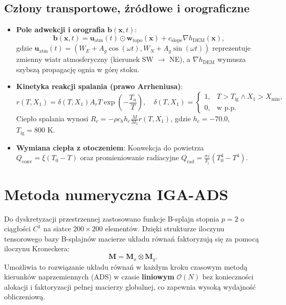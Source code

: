 \documentclass[11pt,a4paper]{article}
\begin{document}
\subsection{Człony transportowe, źródłowe i orograficzne}
\begin{itemize}
    \item \textbf{Pole adwekcji i orografia $\mathbf{b}(\mathbf{x}, t)$}:
    \begin{equation}
        \mathbf{b}(\mathbf{x}, t) = \mathbf{u}_{\text{atm}}(t) \odot \mathbf{w}_{\text{topo}}(\mathbf{x}) + c_{\text{slope}} \nabla h_{\text{DEM}}(\mathbf{x}),
    \end{equation}
    gdzie $\mathbf{u}_{\text{atm}}(t) = (W_E + A_g \cos(\omega t), W_N + A_g \sin(\omega t))$ reprezentuje zmienny wiatr atmosferyczny (kierunek SW $\to$ NE), a $\nabla h_{\text{DEM}}$ wymusza szybszą propagację ognia w górę stoku.
    \item \textbf{Kinetyka reakcji spalania (prawo Arrheniusa)}:
    \begin{equation}
        r(T, X_1) = \delta(T, X_1) A_r T \exp\left(-\frac{T_a}{T}\right), \quad \delta(T, X_1) = \begin{cases} 1, & T > T_{\text{ig}} \land X_1 > X_{\text{min}}, \\ 0, & \text{w p.p.} \end{cases}
    \end{equation}
    Ciepło spalania wynosi $R_c = - \rho c_h h_c \frac{M}{M_1} r(T, X_1)$, gdzie $h_c = -70.0$, $T_{\text{ig}} = 800\text{ K}$.
    \item \textbf{Wymiana ciepła z otoczeniem}:
    Konwekcja do powietrza $Q_{\text{conv}} = \xi(T_0 - T)$ oraz promieniowanie radiacyjne $Q_{\text{rad}} = \frac{\sigma \varepsilon}{\delta_z}(T_0^4 - T^4)$.
\end{itemize}

\section{Metoda numeryczna IGA-ADS}
Do dyskretyzacji przestrzennej zastosowano funkcje B-splajn stopnia $p=2$ o ciągłości $C^1$ na siatce $200 \times 200$ elementów. Dzięki strukturze iloczynu tensorowego bazy B-splajnów macierze układu równań faktoryzują się za pomocą iloczynu Kroneckera:
\begin{equation}
    \mathbf{M} = \mathbf{M}_x \otimes \mathbf{M}_y.
\end{equation}
Umożliwia to rozwiązanie układu równań w każdym kroku czasowym metodą kierunków naprzemiennych (ADS) w czasie \textbf{liniowym} $\mathcal{O}(N)$ bez konieczności alokacji i faktoryzacji pełnej macierzy globalnej, co zapewnia wysoką wydajność obliczeniową.
\end{document}
